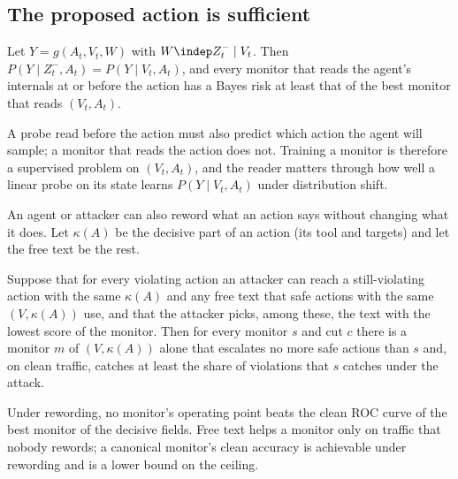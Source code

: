 \subsection{The proposed action is sufficient}
\begin{corollary}\label{cor:action}
Let $Y=g(A_t,V_t,W)$ with $W\indep Z^-_t\mid V_t$. Then $P(Y\mid Z^-_t,A_t)=P(Y\mid V_t,A_t)$, and every monitor that reads the agent's internals at or before the action has a Bayes risk at least that of the best monitor that reads $(V_t,A_t)$.
\end{corollary}
A probe read before the action must also predict which action the agent will sample; a monitor that reads the action does not. Training a monitor is therefore a supervised problem on $(V_t,A_t)$, and the reader matters through how well a linear probe on its state learns $P(Y\mid V_t,A_t)$ under distribution shift.

An agent or attacker can also reword what an action says without changing what it does. Let $\kappa(A)$ be the decisive part of an action (its tool and targets) and let the free text be the rest.
\begin{proposition}\label{prop:ceiling}
Suppose that for every violating action an attacker can reach a still-violating action with the same $\kappa(A)$ and any free text that safe actions with the same $(V,\kappa(A))$ use, and that the attacker picks, among these, the text with the lowest score of the monitor. Then for every monitor $s$ and cut $c$ there is a monitor $m$ of $(V,\kappa(A))$ alone that escalates no more safe actions than $s$ and, on clean traffic, catches at least the share of violations that $s$ catches under the attack.
\end{proposition}
Under rewording, no monitor's operating point beats the clean ROC curve of the best monitor of the decisive fields. Free text helps a monitor only on traffic that nobody rewords; a canonical monitor's clean accuracy is achievable under rewording and is a lower bound on the ceiling.

